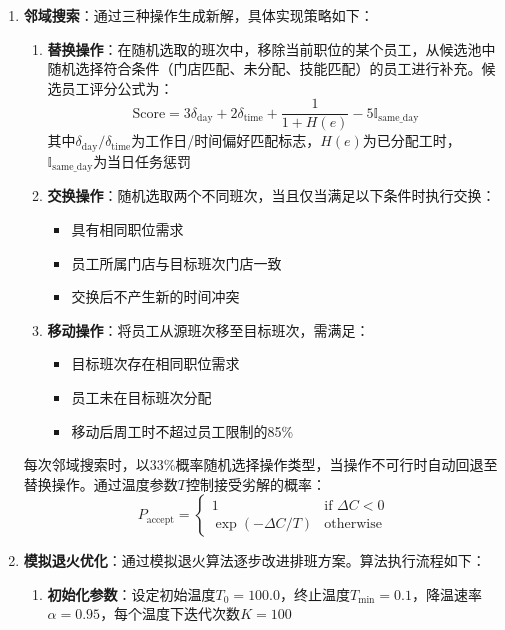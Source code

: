 \begin{enumerate}
    \item \textbf{邻域搜索}：通过三种操作生成新解，具体实现策略如下：
    \begin{enumerate}
        \item \textbf{替换操作}：在随机选取的班次中，移除当前职位的某个员工，从候选池中随机选择符合条件（门店匹配、未分配、技能匹配）的员工进行补充。候选员工评分公式为：
        \begin{equation}
        \text{Score} = 3\delta_{\text{day}} + 2\delta_{\text{time}} + \frac{1}{1+H(e)} - 5\mathbb{I}_{\text{same\_day}}
        \end{equation}
        其中$\delta_{\text{day}}/\delta_{\text{time}}$为工作日/时间偏好匹配标志，$H(e)$为已分配工时，$\mathbb{I}_{\text{same\_day}}$为当日任务惩罚
        
        \item \textbf{交换操作}：随机选取两个不同班次，当且仅当满足以下条件时执行交换：
        \begin{itemize}
            \item 具有相同职位需求
            \item 员工所属门店与目标班次门店一致
            \item 交换后不产生新的时间冲突
        \end{itemize}
        
        \item \textbf{移动操作}：将员工从源班次移至目标班次，需满足：
        \begin{itemize}
            \item 目标班次存在相同职位需求
            \item 员工未在目标班次分配
            \item 移动后周工时不超过员工限制的85\%
        \end{itemize}
    \end{enumerate}
    每次邻域搜索时，以33\%概率随机选择操作类型，当操作不可行时自动回退至替换操作。通过温度参数$T$控制接受劣解的概率：
    \begin{equation}
    P_{\text{accept}} = \begin{cases}
    1 & \text{if } \Delta C < 0 \\
    \exp(-\Delta C / T) & \text{otherwise}
    \end{cases}
    \end{equation}
    
    \item \textbf{模拟退火优化}：通过模拟退火算法逐步改进排班方案。算法执行流程如下：
    \begin{enumerate}
        \item \textbf{初始化参数}：设定初始温度$T_0=100.0$，终止温度$T_{\min}=0.1$，降温速率$\alpha=0.95$，每个温度下迭代次数$K=100$
        

\end{enumerate}
\end{enumerate}
